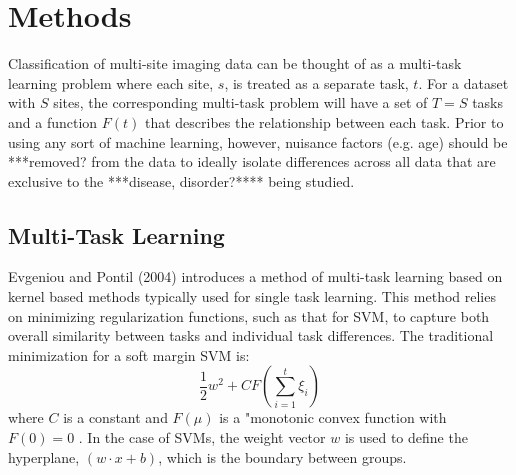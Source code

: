 \documentclass{llncs}
\begin{document}
\section{Methods}
Classification of multi-site imaging data can be thought of as a multi-task learning problem where each site,  $s$, is treated as a separate task, $t$.  For a dataset with $S$ sites, the corresponding multi-task problem will have a set of $T = S$ tasks and a function $F(t)$ that describes the relationship between each task.
Prior to using any sort of machine learning, however, nuisance factors (e.g. age) should be ***removed? from the data to ideally isolate differences across all data that are exclusive to the ***disease, disorder?**** being studied.


\subsection{Multi-Task Learning}
Evgeniou and Pontil (2004) introduces a method of multi-task learning based on kernel based methods typically used for single task learning.  This method relies on minimizing regularization functions, such as that for SVM, to capture both overall similarity between tasks and individual task differences.  The traditional minimization for a soft margin SVM is:\\
\begin{equation}
\label{eq:svm}
\frac{1}{2}w^2 + C F(\sum_{i=1}^t \xi_i)
\end{equation}
where $C$ is a constant and $F(\mu)$ is a "monotonic convex function with $F(0)=0$ \cite{svm}. In the case of SVMs, the weight vector $w$ is used to define the hyperplane, $(w \cdot x +b)$,  which is the boundary between groups.
\end{document}
